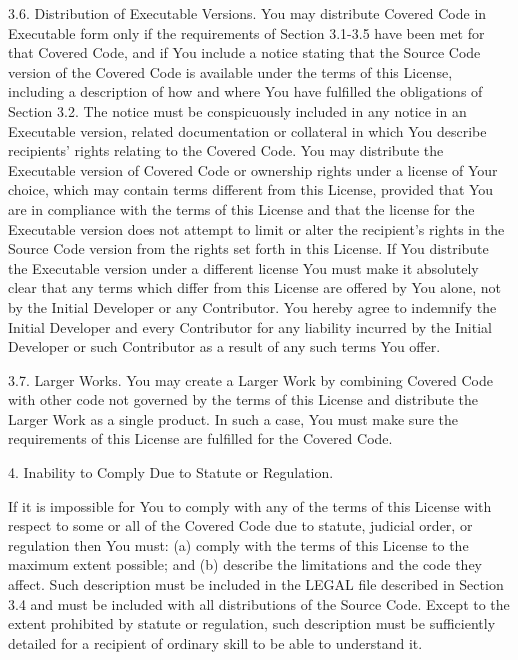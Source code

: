 \begin{DoxyCode}
     3.6. Distribution of Executable Versions.
     You may distribute Covered Code in Executable form only if the
     requirements of Section 3.1-3.5 have been met for that Covered Code,
     and if You include a notice stating that the Source Code version of
     the Covered Code is available under the terms of this License,
     including a description of how and where You have fulfilled the
     obligations of Section 3.2. The notice must be conspicuously included
     in any notice in an Executable version, related documentation or
     collateral in which You describe recipients' rights relating to the
     Covered Code. You may distribute the Executable version of Covered
     Code or ownership rights under a license of Your choice, which may
     contain terms different from this License, provided that You are in
     compliance with the terms of this License and that the license for the
     Executable version does not attempt to limit or alter the recipient's
     rights in the Source Code version from the rights set forth in this
     License. If You distribute the Executable version under a different
     license You must make it absolutely clear that any terms which differ
     from this License are offered by You alone, not by the Initial
     Developer or any Contributor. You hereby agree to indemnify the
     Initial Developer and every Contributor for any liability incurred by
     the Initial Developer or such Contributor as a result of any such
     terms You offer.

     3.7. Larger Works.
     You may create a Larger Work by combining Covered Code with other code
     not governed by the terms of this License and distribute the Larger
     Work as a single product. In such a case, You must make sure the
     requirements of this License are fulfilled for the Covered Code.

4. Inability to Comply Due to Statute or Regulation.

     If it is impossible for You to comply with any of the terms of this
     License with respect to some or all of the Covered Code due to
     statute, judicial order, or regulation then You must: (a) comply with
     the terms of this License to the maximum extent possible; and (b)
     describe the limitations and the code they affect. Such description
     must be included in the LEGAL file described in Section 3.4 and must
     be included with all distributions of the Source Code. Except to the
     extent prohibited by statute or regulation, such description must be
     sufficiently detailed for a recipient of ordinary skill to be able to
     understand it.


\end{DoxyCode}
